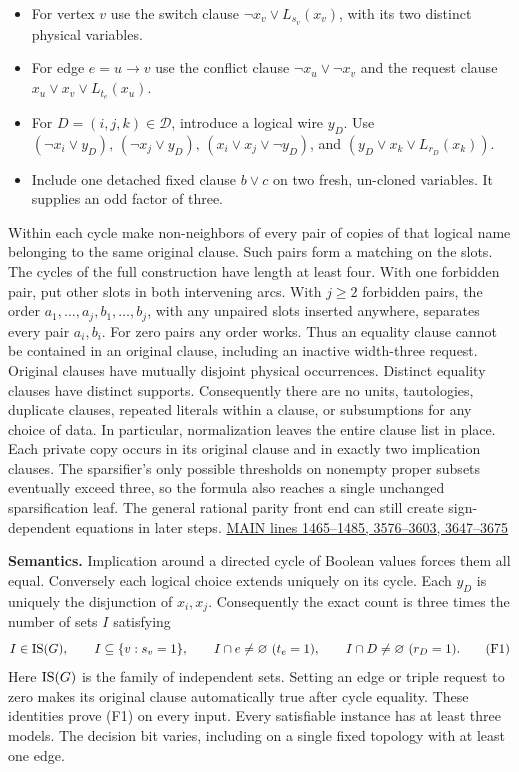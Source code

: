 \documentclass[
  11pt,
]{article}
\providecommand{\tightlist}{%
  \setlength{\itemsep}{0pt}\setlength{\parskip}{0pt}}
\begin{document}
\begin{itemize}
\tightlist
\item
  For vertex \(v\) use the switch clause \(\neg x_v\vee L_{s_v}(x_v)\),
  with its two distinct physical variables.
\item
  For edge \(e=u\to v\) use the conflict clause \(\neg x_u\vee\neg x_v\)
  and the request clause \(x_u\vee x_v\vee L_{t_e}(x_u)\).
\item
  For \(D=(i,j,k)\in\mathcal D\), introduce a logical wire \(y_D\). Use
  \((\neg x_i\vee y_D),\,(\neg x_j\vee y_D),\,(x_i\vee x_j\vee\neg y_D)\),
  and \((y_D\vee x_k\vee L_{r_D}(x_k))\).
\item
  Include one detached fixed clause \(b\vee c\) on two fresh, un-cloned
  variables. It supplies an odd factor of three.
\end{itemize}

Within each cycle make non-neighbors of every pair of copies of that
logical name belonging to the same original clause. Such pairs form a
matching on the slots. The cycles of the full construction have length
at least four. With one forbidden pair, put other slots in both
intervening arcs. With \(j\ge2\) forbidden pairs, the order
\(a_1,\ldots,a_j,b_1,\ldots,b_j\), with any unpaired slots inserted
anywhere, separates every pair \(a_i,b_i\). For zero pairs any order
works. Thus an equality clause cannot be contained in an original
clause, including an inactive width-three request. Original clauses have
mutually disjoint physical occurrences. Distinct equality clauses have
distinct supports. Consequently there are no units, tautologies,
duplicate clauses, repeated literals within a clause, or subsumptions
for any choice of data. In particular, normalization leaves the entire
clause list in place. Each private copy occurs in its original clause
and in exactly two implication clauses. The sparsifier's only possible
thresholds on nonempty proper subsets eventually exceed three, so the
formula also reaches a single unchanged sparsification leaf. The general
rational parity front end can still create sign-dependent equations in
later steps.
\href{https://github.com/openai/math/blob/main/preprints/The-Exponential-Time-Hypothesis-is-False-October-25-2026/build/main_full_version.tex\#L3647}{MAIN
lines 1465--1485, 3576--3603, 3647--3675}

\textbf{Semantics.} Implication around a directed cycle of Boolean
values forces them all equal. Conversely each logical choice extends
uniquely on its cycle. Each \(y_D\) is uniquely the disjunction of
\(x_i,x_j\). Consequently the exact count is three times the number of
sets \(I\) satisfying \[
 I\in{\rm IS}(G),\qquad I\subseteq\{v:s_v=1\},\qquad
 I\cap e\ne\varnothing\ (t_e=1),\qquad I\cap D\ne\varnothing\ (r_D=1).
 \tag{F1}
\] Here \({\rm IS}(G)\) is the family of independent sets. Setting an
edge or triple request to zero makes its original clause automatically
true after cycle equality. These identities prove (F1) on every input.
Every satisfiable instance has at least three models. The decision bit
varies, including on a single fixed topology with at least one edge.
\end{document}

